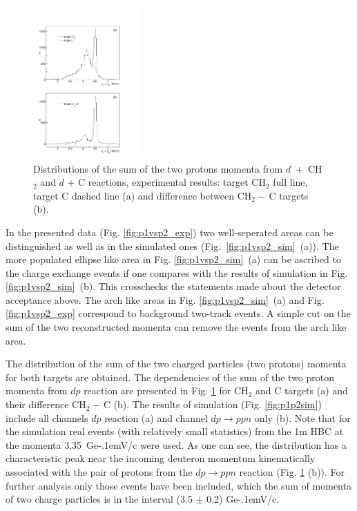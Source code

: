 \documentclass[twocolumn,epjc3]{svjour3}
\newcommand{\dpfrag} {\ensuremath{dp \rightarrow ppn}\xspace}
\newcommand{\dpchex} {\ensuremath{dp \rightarrow (pp)n}\xspace}
\newcommand{\GeVc}   {Ge\kern-.1emV/c\xspace}
\begin{document}
\begin{figure}[b]
  \centering
  \includegraphics[width=0.37\textwidth]{p1_plus_p2_1.pdf}    %
  \caption{Distributions of the sum of the two protons momenta from
    $d$~+~CH$_{2}$ and $d$ + C reactions, experimental results: target CH$_2$
    full line, target C dashed line (a) and difference between CH$_2-\,$C
    targets (b).}
  \label{fig:p1p2exp}
\end{figure}

In the presented data (Fig. \ref{fig:p1vsp2_exp}) two well-seperated areas can
be distinguished as well as in the simulated ones
(Fig.~\ref{fig:p1vsp2_sim}~(a)). The more populated ellipse like area in
Fig. \ref{fig:p1vsp2_sim}~(a) can be ascribed to the charge exchange events if
one compares with the results of simulation in %
Fig. \ref{fig:p1vsp2_sim}~(b). This crosschecks the statements made about the
detector acceptance above. The arch like areas in Fig. \ref{fig:p1vsp2_sim}~(a)
and Fig. \ref{fig:p1vsp2_exp} correspond to background two-track events. A
simple cut on the sum of the two reconstructed momenta can remove the events
from the arch like area.

The distribution of the sum of the two charged particles (two protons) momenta
for both targets are obtained.
The dependencies of the sum of the two proton momenta from $dp$ reaction are
presented in Fig. \ref{fig:p1p2exp} for CH$_2$ and C targets (a) and their
difference CH$_2-\,$C (b). The results of simulation (Fig. \ref{fig:p1p2sim})
include all channels $dp$ reaction (a) and channel \dpfrag only (b). Note that
for the simulation real events (with relatively small statistics) from the 1m
HBC at the momenta 3.35~\GeVc were used. As one can see, the distribution has a
characteristic peak near the incoming deuteron momentum kinematically associated
with the pair of protons from the \dpfrag reaction (Fig. \ref{fig:p1p2exp} (b)).
For further analysis only those events have been included, which the sum of
momenta of two charge particles is in the interval (3.5 $\pm$ 0.2) \GeVc.
\end{document}
